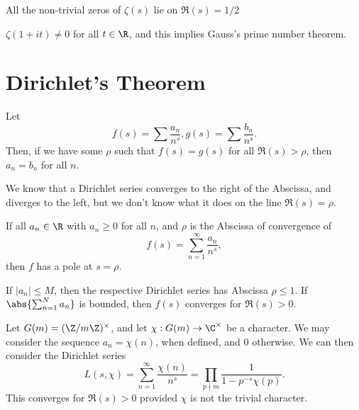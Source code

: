 \begin{notebox*}
    All the non-trivial zeros of $\zeta(s)$ lie on $\Re (s) = 1/2$
\end{notebox*}

\begin{thm}
    $\zeta(1+it) \neq 0$ for all $t \in \R$, and this implies Gauss's prime number theorem.
\end{thm}

\section{Dirichlet's Theorem}

\begin{notebox*}[Fact]
    Let
    $$f(s) = \sum \frac{a_n}{n^s},g(s) = \sum\frac{b_n}{n^s}.$$
    Then, if we have some $\rho$ such that $f(s) = g(s)$ for all $\Re(s) > \rho$, then $a_n=b_n$ for all $n$.
\end{notebox*}

We know that a Dirichlet series converges to the right of the Abscissa, and diverges to the left, but we don't know what it does on the line $\Re(s) = \rho$.

\begin{thm}
    If all $a_n \in \R$ with $a_n \geq 0$ for all $n$, and $\rho$ is the Abscissa of convergence of
    $$f(s) = \sum_{n=1}^\infty \frac{a_n}{n^s},$$
    then $f$ has a pole at $s=\rho$.
\end{thm}

\begin{thm}
    If $|a_n| \leq M$, then the respective Dirichlet series has Abscissa $\rho \leq 1$. If $\abs{\sum_{n=1}^Na_n}$ is bounded, then $f(s)$ converges for $\Re(s) >0$.
\end{thm}

\begin{rmk}
    Let $G(m) = (\Z/m\Z)^\times$, and let $\chi : G(m) \to \C^\times$ be a character. We may consider the sequence $a_n = \chi(n)$, when defined, and $0$ otherwise. We can then consider the Dirichlet series
    $$L(s,\chi) = \sum_{n=1}^\infty \frac{\chi (n)}{n^s}=\prod_{p \nmid m}\frac{1}{1-p^{-s}\chi(p)}.$$
    This converges for $\Re (s) > 0$ provided $\chi$ is not the trivial character.
\end{rmk}

